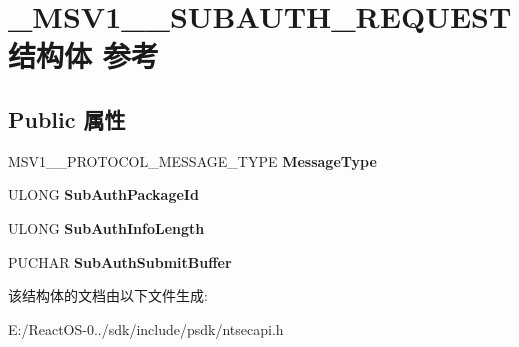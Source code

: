 \hypertarget{struct___m_s_v1__0___s_u_b_a_u_t_h___r_e_q_u_e_s_t}{}\section{\+\_\+\+M\+S\+V1\+\_\+\_\+\+S\+U\+B\+A\+U\+T\+H\+\_\+\+R\+E\+Q\+U\+E\+S\+T结构体 参考}
\label{struct___m_s_v1__0___s_u_b_a_u_t_h___r_e_q_u_e_s_t}
\subsection*{Public 属性}
\begin{DoxyCompactItemize}
\item 
\mbox{\label{struct___m_s_v1__0___s_u_b_a_u_t_h___r_e_q_u_e_s_t_a99fd8fcdcb0729c1b34e191956a20680}} 
M\+S\+V1\+\_\+\_\+\+P\+R\+O\+T\+O\+C\+O\+L\+\_\+\+M\+E\+S\+S\+A\+G\+E\+\_\+\+T\+Y\+PE {\bfseries Message\+Type}
\item 
\mbox{\label{struct___m_s_v1__0___s_u_b_a_u_t_h___r_e_q_u_e_s_t_ada014a15f9a6f65ee5e245d35be37be5}} 
U\+L\+O\+NG {\bfseries Sub\+Auth\+Package\+Id}
\item 
\mbox{\label{struct___m_s_v1__0___s_u_b_a_u_t_h___r_e_q_u_e_s_t_a18490af6a1a8a43cdad28b2d74f41539}} 
U\+L\+O\+NG {\bfseries Sub\+Auth\+Info\+Length}
\item 
\mbox{\label{struct___m_s_v1__0___s_u_b_a_u_t_h___r_e_q_u_e_s_t_a0270358efc36370f3d1142d474d18be5}} 
P\+U\+C\+H\+AR {\bfseries Sub\+Auth\+Submit\+Buffer}
\end{DoxyCompactItemize}


该结构体的文档由以下文件生成\+:\begin{DoxyCompactItemize}
\item 
E\+:/\+React\+O\+S-\/0../sdk/include/psdk/ntsecapi.\+h\end{DoxyCompactItemize}
